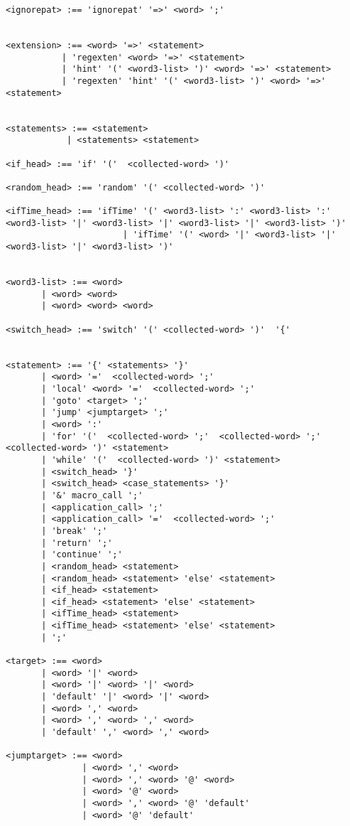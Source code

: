 {\begin{verbatim}
<ignorepat> :== 'ignorepat' '=>' <word> ';'


<extension> :== <word> '=>' <statement>
           | 'regexten' <word> '=>' <statement>
           | 'hint' '(' <word3-list> ')' <word> '=>' <statement>
           | 'regexten' 'hint' '(' <word3-list> ')' <word> '=>' <statement>


<statements> :== <statement>
            | <statements> <statement>

<if_head> :== 'if' '('  <collected-word> ')'

<random_head> :== 'random' '(' <collected-word> ')'

<ifTime_head> :== 'ifTime' '(' <word3-list> ':' <word3-list> ':' <word3-list> '|' <word3-list> '|' <word3-list> '|' <word3-list> ')'
                       | 'ifTime' '(' <word> '|' <word3-list> '|' <word3-list> '|' <word3-list> ')'


<word3-list> :== <word>
       | <word> <word>
       | <word> <word> <word>

<switch_head> :== 'switch' '(' <collected-word> ')'  '{'


<statement> :== '{' <statements> '}'
       | <word> '='  <collected-word> ';'
       | 'local' <word> '='  <collected-word> ';'
       | 'goto' <target> ';'
       | 'jump' <jumptarget> ';'
       | <word> ':'
       | 'for' '('  <collected-word> ';'  <collected-word> ';' <collected-word> ')' <statement>
       | 'while' '('  <collected-word> ')' <statement>
       | <switch_head> '}'
       | <switch_head> <case_statements> '}'
       | '&' macro_call ';'
       | <application_call> ';'
       | <application_call> '='  <collected-word> ';'
       | 'break' ';'
       | 'return' ';'
       | 'continue' ';'
       | <random_head> <statement>
       | <random_head> <statement> 'else' <statement>
       | <if_head> <statement>
       | <if_head> <statement> 'else' <statement>
       | <ifTime_head> <statement>
       | <ifTime_head> <statement> 'else' <statement>
       | ';'

<target> :== <word>
       | <word> '|' <word>
       | <word> '|' <word> '|' <word>
       | 'default' '|' <word> '|' <word>
       | <word> ',' <word>
       | <word> ',' <word> ',' <word>
       | 'default' ',' <word> ',' <word>

<jumptarget> :== <word>
               | <word> ',' <word>
               | <word> ',' <word> '@' <word>
               | <word> '@' <word>
               | <word> ',' <word> '@' 'default'
               | <word> '@' 'default'


\end{verbatim}}
